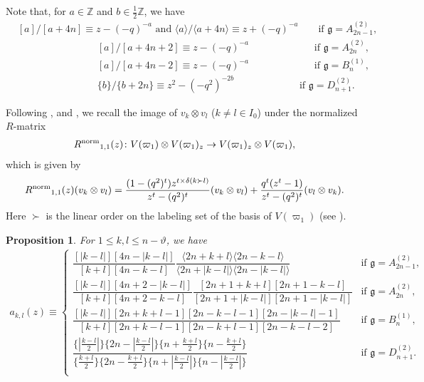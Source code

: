 \documentclass[11pt, leqno]{amsart}
\newtheorem{proposition}[theorem]{Proposition}
\theoremstyle{definition}
\numberwithin{equation}{section}
\begin{document}
Note that, for $a \in {\mathbb Z}$ and $b \in \frac{1}{2} {\mathbb Z}$, we have
\begin{equation} \label{eq: division value}
\begin{aligned}
&[a]/[a+4n] \equiv z-(-q)^{-a} \text{ and } \langle a \rangle /\langle a+4n \rangle \equiv z+(-q)^{-a} \quad \ \ \ \text{ if ${\mathfrak g}=A^{(2)}_{2n-1}$}, \\
& \qquad \qquad \qquad \qquad [a]/[a+4n+2] \equiv z-(-q)^{-a} \qquad\qquad\qquad \ \text{ if ${\mathfrak g}=A^{(2)}_{2n}$}, \\
& \qquad \qquad \qquad \qquad [a]/[a+4n-2] \equiv z-(-q)^{-a} \qquad\qquad\qquad \ \text{ if ${\mathfrak g}=B^{(1)}_{n}$}, \\
& \qquad \qquad \qquad \qquad \{ b \} / \{ b+2n  \} \equiv z^2-{(-q^2)}^{-2b} \qquad\qquad\qquad \ \text{ if ${\mathfrak g}=D^{(2)}_{n+1}$}. \end{aligned}
\end{equation}

\medskip

Following \cite{JMO00}, \cite[(3.12)]{DO96} and \cite[(3.7)]{J86}, we recall the image of $v_k \otimes v_l$ ($k \ne l \in I_0$) under the
normalized $R$-matrix
\begin{align*}
  {R^{\rm{norm}}}_{1,1}(z) \colon
   V(\varpi_1) \otimes V(\varpi_1)_z \rightarrow V(\varpi_1)_z \otimes V(\varpi_1),
\end{align*}
which is given by
\begin{align} \label{eq:rmatrix 11}
  {R^{\rm{norm}}}_{1,1}(z)(v_k \otimes v_l) =
   \dfrac{(1-(q^2)^t) z^{t\times\delta(k \succ l)}}{z^t-(q^2)^t} (v_k \otimes v_l)
   + \dfrac{q^t(z^t-1)}{z^t-(q^2)^t} (v_l \otimes v_k).
\end{align}
Here $\succ$ is the linear order on the labeling set of the basis of $V({\varpi}_1)$ (see \cite[Section 8]{HK02}).

\begin{proposition} \label{prop: akl}
  For $1 \le k,l \le n-\vartheta$, we have
  \begin{align} \label{eq: akl}
    a_{k,l} (z) \equiv
    \begin{cases}
    \dfrac{[|k-l|][4n-|k-l|]}{[k+l][4n-k-l]}
    \dfrac{\langle 2n+k+l \rangle \langle 2n-k-l \rangle }{\langle 2n+|k-l| \rangle \langle 2n-|k-l| \rangle} & \text{if ${\mathfrak g}=A^{(2)}_{2n-1}$, } \\[2ex]
    \dfrac{[|k-l|][4n+2-|k-l|]}{[k+l][4n+2-k-l]}\dfrac{[2n+1+k+l][2n+1-k-l]}{[2n+1+|k-l|][2n+1-|k-l|]}  & \text{if ${\mathfrak g}=A^{(2)}_{2n}$}, \\[2ex]
    \dfrac{[|k-l|][2n+k+l-1][2n-k-l-1][2n-|k-l|-1]}{[k+l][2n+k-l-1][2n-k+l-1][2n-k-l-2]} & \text{if ${\mathfrak g}=B^{(1)}_{n}$},  \\[2ex]
    \dfrac{ \{|\frac{k-l}{2}| \}\{2n-|\frac{k-l}{2}|\}\{n+\frac{k+l}{2}\}\{n-\frac{k+l}{2}\}}
{\{\frac{k+l}{2}\}\{2n-\frac{k+l}{2}\}\{n+|\frac{k-l}{2}|\}\{n-|\frac{k-l}{2}|\}} & \text{if ${\mathfrak g}=D^{(2)}_{n+1}$}.  \\[2ex]
    \end{cases}
  \end{align}
\end{proposition}
\end{document}
